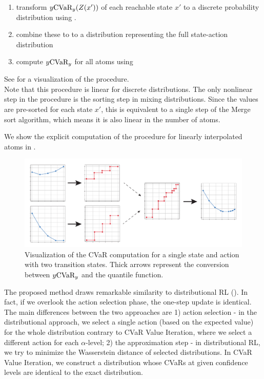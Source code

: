 \begin{enumerate}
\item transform $y \text{CVaR}_y(Z(x'))$ of each reachable state $x'$ to a discrete probability distribution using .
\item combine these to to a distribution representing the full state-action distribution
\item compute $y \text{CVaR}_y$ for all atoms using 
\end{enumerate}
See  for a visualization of the procedure. 
\\
Note that this procedure is linear for discrete distributions. The only nonlinear step in the procedure is the sorting step in mixing distributions. Since the values are pre-sorted for each state $x'$, this is equivalent to a single step of the Merge sort algorithm, which means it is also linear in the number of atoms.

We show the explicit computation of the procedure for linearly interpolated atoms in .


\begin{figure}
\center
\includegraphics[width=\linewidth]{gfx/cvar_vi_conversion.pdf}
\caption{Visualization of the CVaR computation for a single state and action with two transition states. Thick arrows represent the conversion between $y\text{CVaR}_y$ and the quantile function.}
\label{fig:cvarcomputation}
\end{figure}

The proposed method draws remarkable similarity to distributional RL (). In fact, if we overlook the action selection phase, the one-step update is identical. The main differences between the two approaches are 1) action selection - in the distributional approach, we select a single action (based on the expected value) for the whole distribution contrary to CVaR Value Iteration, where we select a different action for each $\alpha$-level; 2) the approximation step - in distributional RL, we try to minimize the Wasserstein distance of selected distributions. In CVaR Value Iteration, we construct a distribution whose CVaRs at given confidence levels are identical to the exact distribution.

